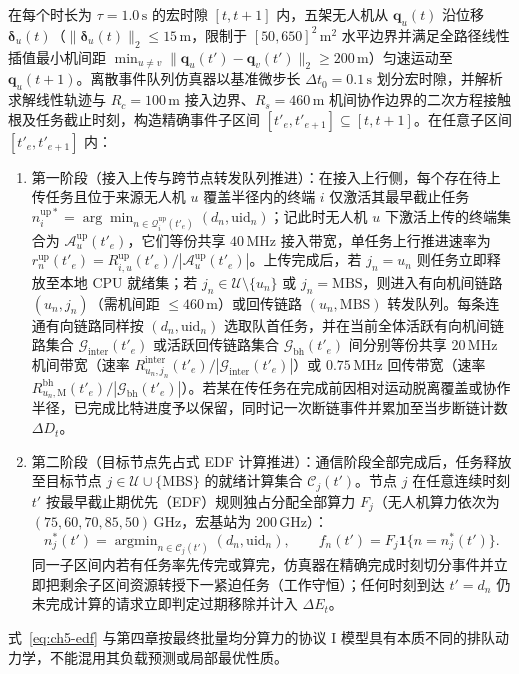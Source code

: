 在每个时长为 $\tau=1.0\,\mathrm{s}$ 的宏时隙 $[t,t+1]$ 内，五架无人机从 $\mathbf{q}_u(t)$ 沿位移 $\boldsymbol{\delta}_u(t)$（$\|\boldsymbol{\delta}_u(t)\|_2\leq 15\,\mathrm{m}$，限制于 $[50,650]^2\,\mathrm{m}^2$ 水平边界并满足全路径线性插值最小机间距 $\min_{u\neq v}\|\mathbf{q}_u(t')-\mathbf{q}_v(t')\|_2\geq 200\,\mathrm{m}$）匀速运动至 $\mathbf{q}_u(t+1)$。离散事件队列仿真器以基准微步长 $\Delta t_0=0.1\,\mathrm{s}$ 划分宏时隙，并解析求解线性轨迹与 $R_c=100\,\mathrm{m}$ 接入边界、$R_s=460\,\mathrm{m}$ 机间协作边界的二次方程接触根及任务截止时刻，构造精确事件子区间 $[t'_e,t'_{e+1}]\subseteq[t,t+1]$。在任意子区间 $[t'_e,t'_{e+1}]$ 内：
\begin{enumerate}
\item 第一阶段（接入上传与跨节点转发队列推进）：在接入上行侧，每个存在待上传任务且位于来源无人机 $u$ 覆盖半径内的终端 $i$ 仅激活其最早截止任务 $n_{i}^{\mathrm{up}*}=\arg\min_{n\in\mathcal{Q}_i^{\mathrm{up}}(t'_e)}(d_n,\mathrm{uid}_n)$；记此时无人机 $u$ 下激活上传的终端集合为 $\mathcal{A}_u^{\mathrm{up}}(t'_e)$，它们等份共享 $40\,\mathrm{MHz}$ 接入带宽，单任务上行推进速率为 $r_n^{\mathrm{up}}(t'_e)=R_{i,u}^{\mathrm{up}}(t'_e)/|\mathcal{A}_u^{\mathrm{up}}(t'_e)|$。上传完成后，若 $j_n=u_n$ 则任务立即释放至本地 CPU 就绪集；若 $j_n\in\mathcal{U}\setminus\{u_n\}$ 或 $j_n=\mathrm{MBS}$，则进入有向机间链路 $(u_n,j_n)$（需机间距 $\leq 460\,\mathrm{m}$）或回传链路 $(u_n,\mathrm{MBS})$ 转发队列。每条连通有向链路同样按 $(d_n,\mathrm{uid}_n)$ 选取队首任务，并在当前全体活跃有向机间链路集合 $\mathcal{G}_{\mathrm{inter}}(t'_e)$ 或活跃回传链路集合 $\mathcal{G}_{\mathrm{bh}}(t'_e)$ 间分别等份共享 $20\,\mathrm{MHz}$ 机间带宽（速率 $R_{u_n,j_n}^{\mathrm{inter}}(t'_e)/|\mathcal{G}_{\mathrm{inter}}(t'_e)|$）或 $0.75\,\mathrm{MHz}$ 回传带宽（速率 $R_{u_n,\mathrm{M}}^{\mathrm{bh}}(t'_e)/|\mathcal{G}_{\mathrm{bh}}(t'_e)|$）。若某在传任务在完成前因相对运动脱离覆盖或协作半径，已完成比特进度予以保留，同时记一次断链事件并累加至当步断链计数 $\Delta D_t$。
\item 第二阶段（目标节点先占式 EDF 计算推进）：通信阶段全部完成后，任务释放至目标节点 $j\in\mathcal{U}\cup\{\mathrm{MBS}\}$ 的就绪计算集合 $\mathcal{C}_j(t')$。节点 $j$ 在任意连续时刻 $t'$ 按最早截止期优先（EDF）规则\cite{liu1973scheduling}独占分配全部算力 $F_j$（无人机算力依次为 $(75,\allowbreak 60,\allowbreak 70,\allowbreak 85,\allowbreak 50)\,\mathrm{GHz}$，宏基站为 $200\,\mathrm{GHz}$）：
\begin{equation}
 n_j^*(t')=\mathop{\arg\min}_{n\in\mathcal C_j(t')}(d_n,\mathrm{uid}_n),\qquad
 f_n(t')=F_j\mathbf1\{n=n_j^*(t')\}.
 \label{eq:ch5-edf}
\end{equation}
同一子区间内若有任务率先传完或算完，仿真器在精确完成时刻切分事件并立即把剩余子区间资源转授下一紧迫任务（工作守恒）；任何时刻到达 $t'=d_n$ 仍未完成计算的请求立即判定过期移除并计入 $\Delta E_t$。
\end{enumerate}
式~\eqref{eq:ch5-edf} 与第四章按最终批量均分算力的协议 I 模型具有本质不同的排队动力学，不能混用其负载预测或局部最优性质。


